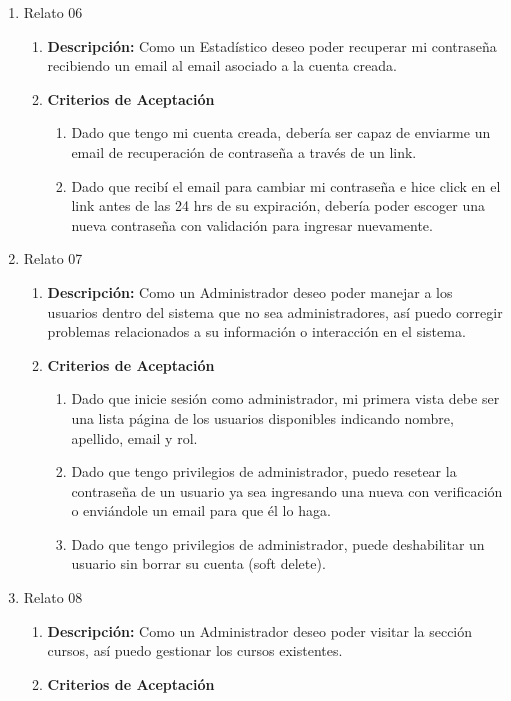 \begin{enumerate}
\begin{enumerate}
		\end{enumerate}
	\item Relato 06
		\begin{enumerate}
			\item \textbf{Descripción:} Como un Estadístico deseo poder recuperar mi contraseña recibiendo un email al email asociado a la cuenta creada.
			\item \textbf{Criterios de Aceptación}
				\begin{enumerate}
					\item Dado que tengo mi cuenta creada, debería ser capaz de enviarme un email de recuperación de contraseña a través de un link.
					\item Dado que recibí el email para cambiar mi contraseña e hice click en el link antes de las 24 hrs de su expiración, debería poder escoger una nueva contraseña con validación para ingresar nuevamente.
				\end{enumerate}
		\end{enumerate}
	\item Relato 07
		\begin{enumerate}
			\item \textbf{Descripción:} Como un Administrador deseo poder manejar a los usuarios dentro del sistema que no sea administradores, así puedo corregir problemas relacionados a su información o interacción en el sistema.
			\item \textbf{Criterios de Aceptación}
				\begin{enumerate}
					\item Dado que inicie sesión como administrador, mi primera vista debe ser una lista página de los usuarios disponibles indicando nombre, apellido, email y rol.
					\item Dado que tengo privilegios de administrador, puedo resetear la contraseña de un usuario ya sea ingresando una nueva con verificación o enviándole un email para que él lo haga.
					\item Dado que tengo privilegios de administrador, puede deshabilitar un usuario sin borrar su cuenta (soft delete).
				\end{enumerate}
		\end{enumerate}
	\item Relato 08
		\begin{enumerate}
			\item \textbf{Descripción:} Como un Administrador deseo poder visitar la sección cursos, así puedo gestionar los cursos existentes.
			\item \textbf{Criterios de Aceptación}

\end{enumerate}
\end{enumerate}

